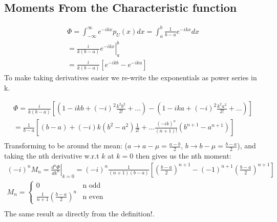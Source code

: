 \documentclass[]{article}
\begin{document}
\subsection{Moments From the Characteristic function}
\begin{align}
\Phi = \int_{-\infty}^{\infty}e^{-i k x}p_U(x)dx = \int_{a}^{b}\frac{1}{b-a}e^{-i k x}dx \nonumber\\
=\left.\frac{i}{k(b-a)}e^{-i k x} \right\vert_a^b\\
= \frac{i}{k(b-a)}\left[e^{-i kb}-e^{-i ka}\right]
\end{align}
To make taking derivatives easier we re-write the exponentials as power series in k.

\begin{align}
\Phi = \frac{i}{k(b-a)} \left[ (1 - i kb +(-i)^2 \frac{k^2b^2}{2!}+ \dots)-\left(1 - i ka +(-i)^2 \frac{k^2a^2}{2!}+ \dots\right)\right] \nonumber\\
= \frac{1}{b-a}\left[(b-a)+(-i) k(b^2-a^2)\frac{1}{2!} + \dots \frac{(-i k)^n}{(n+1)!}(b^{n+1}-a^{n+1})\right]\\
\end{align}
Transforming to be around the mean: ($a\to a-\mu =\frac{a-b}{2}$, $b\to b-\mu =\frac{b-a}{2}$), and taking the nth derivative w.r.t $k$ at $k=0$ then gives us the nth moment:
\begin{align}
(-i)^nM_n = \left.\frac{d^n \Phi}{dk^n}\right\vert_{k=0} = (-i)^n \frac{1}{(n+1)(b-a)}\left[\left(\frac{b-a}{2}\right)^{n+1}- (-1)^{n+1}\left(\frac{b-a}{2}\right)^{n+1}\right] \nonumber\\
M_n = \begin{cases}
0 & \text{n odd} \nonumber\\
\frac{1}{n+1}\left(\frac{b-a}{2}\right)^{n} & \text{n even}
\end{cases}\\
\end{align}
The same result as directly from the definition!.
\end{document}
